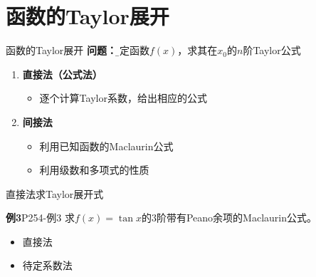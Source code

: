 \section{函数的Taylor展开}

% 	

\begin{frame}{函数的Taylor展开}
	\linespread{2}\pause 
	{\bf 问题：}{\b 给定函数$f(x)$，求其在$x_0$的$n$阶Taylor公式}\pause 
	\begin{enumerate}
	  \item {\bf 直接法（公式法）}\pause 
	  \begin{itemize}
	    \item 逐个计算Taylor系数，给出相应的公式\pause 
	  \end{itemize}
	  \item {\bf 间接法}\pause 
	  \begin{itemize}
	    \item 利用已知函数的Maclaurin公式\pause 
	    \item 利用级数和多项式的性质
	  \end{itemize}
	\end{enumerate}
\end{frame}

\begin{frame}{直接法求Taylor展开式}
	\linespread{1.5}\pause 
	\begin{exampleblock}{{\bf 例3}\hfill P254-例3}
		求$f(x)=\tan x$的$3$阶带有Peano余项的Maclaurin公式。
	\end{exampleblock}\pause 
	\begin{itemize}
	  \item 直接法\pause 
	  \item 待定系数法
	\end{itemize}
\end{frame}

